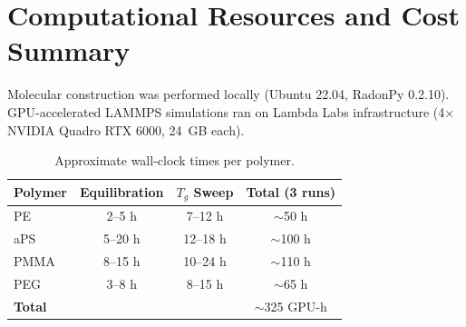 \documentclass[journal=acsami,manuscript=suppinfo]{achemso}
\begin{document}
\section{Computational Resources and Cost Summary}
\label{sec:si_cost}

Molecular construction was performed locally (Ubuntu 22.04, RadonPy 0.2.10).
GPU-accelerated LAMMPS simulations ran on Lambda Labs infrastructure (4$\times$ NVIDIA Quadro RTX 6000, 24~GB each).

\begin{table}[H]
\centering
\caption{Approximate wall-clock times per polymer.}
\label{tab:si_walltimes}
\small
\begin{tabular}{lccc}
\toprule
\textbf{Polymer} & \textbf{Equilibration} & $T_g$ \textbf{Sweep} & \textbf{Total (3 runs)} \\
\midrule
PE & 2--5 h & 7--12 h & $\sim$50 h \\
aPS & 5--20 h & 12--18 h & $\sim$100 h \\
PMMA & 8--15 h & 10--24 h & $\sim$110 h \\
PEG & 3--8 h & 8--15 h & $\sim$65 h \\
\midrule
\textbf{Total} & & & $\sim$325 GPU-h \\
\bottomrule
\end{tabular}
\end{table}



\end{document}
